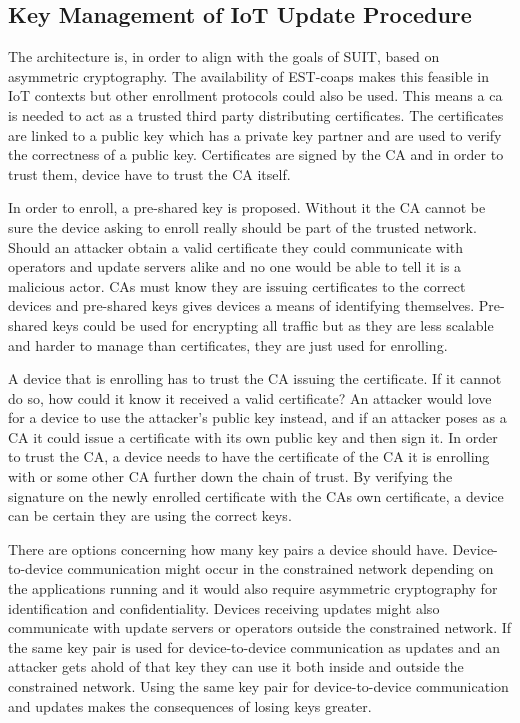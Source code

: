 \documentclass[0-thesis.tex]{subfiles}
\begin{document}
\subsection{Key Management of IoT Update Procedure}
\label{ssec:key-management}
The architecture is, in order to align with the goals of SUIT, based on asymmetric
cryptography. The availability of EST-coaps makes this feasible in IoT contexts but other
enrollment protocols could also be used. This means a \acrfull{ca} is needed to act as
a trusted third party distributing certificates. The certificates are linked to a public
key which has a private key partner and are used to verify the correctness of a public
key. Certificates are signed by the CA and in order to trust them, device have to trust
the CA itself.

In order to enroll, a pre-shared key is proposed. Without it the CA cannot be sure the
device asking to enroll really should be part of the trusted network. Should an attacker
obtain a valid certificate they could communicate with operators and update servers alike
and no one would be able to tell it is a malicious actor. CAs must know they are issuing
certificates to the correct devices and pre-shared keys gives devices a means of
identifying themselves. Pre-shared keys could be used for encrypting all traffic but as
they are less scalable and harder to manage than certificates, they are just used for
enrolling.

A device that is enrolling has to trust the CA issuing the certificate. If it cannot do
so, how could it know it received a valid certificate? An attacker would love for a device
to use the attacker's public key instead, and if an attacker poses as a CA it could issue
a certificate with its own public key and then sign it. In order to trust the CA, a device
needs to have the certificate of the CA it is enrolling with or some other CA further down
the chain of trust. By verifying the signature on the newly enrolled certificate with the
CAs own certificate, a device can be certain they are using the correct keys.

There are options concerning how many key pairs a device should have. Device-to-device
communication might occur in the constrained network depending on the applications running
and it would also require asymmetric cryptography for identification and confidentiality.
Devices receiving updates might also communicate with update servers or operators outside
the constrained network. If the same key pair is used for device-to-device communication
as updates and an attacker gets ahold of that key they can use it both inside and outside
the constrained network. Using the same key pair for device-to-device communication and
updates makes the consequences of losing keys greater. 
\end{document}
